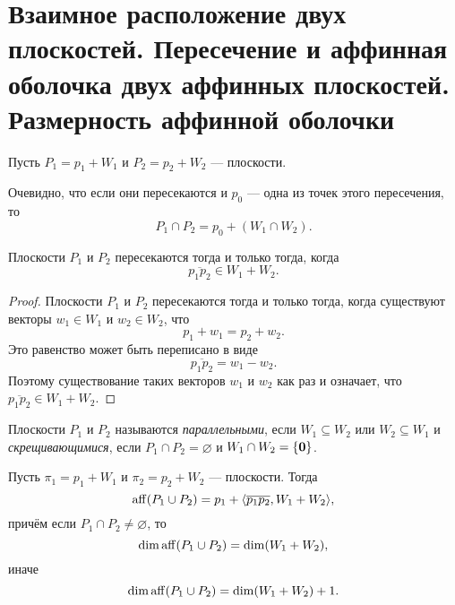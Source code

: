 \section{Взаимное расположение двух плоскостей. Пересечение и аффинная оболочка двух
аффинных плоскостей. Размерность аффинной оболочки}

Пусть $P_1 = p_1 + W_1$ и $P_2 = p_2 + W_2$ --- плоскости.

Очевидно, что если они пересекаются и $p_0$ --- одна из точек этого пересечения, то
\[
    P_1 \cap P_2 = p_0 + (W_1 \cap W_2).
\]

\begin{theorem}
    Плоскости $P_1$ и $P_2$ пересекаются тогда и только тогда, когда
    \[
        \overline{p_1p_2} \in W_1 + W_2.
    \]
\end{theorem}

\begin{proof}
    Плоскости $P_1$ и $P_2$ пересекаются тогда и только тогда, когда существуют векторы $w_1 \in W_1$ и $w_2 \in W_2$, что
    \[
        p_1 + w_1 = p_2 + w_2.
    \]
    Это равенство может быть переписано в виде
    \[
        \overline{p_1p_2} = w_1 - w_2.
    \]
    Поэтому существование таких векторов $w_1$ и $w_2$ как раз и означает, что $\overline{p_1p_2} \in W_1 + W_2$.
\end{proof}

\begin{definition}
    Плоскости $P_1$ и $P_2$ называются \textit{параллельными}, если $W_1 \subseteq W_2$ или $W_2 \subseteq W_1$ и \textit{скрещивающимися}, если $P_1 \cap P_2 = \varnothing$ и $W_1 \cap W_2 = \{\boldsymbol{0}\}$.
\end{definition}

\begin{theorem}
    Пусть $\pi_1 = p_1 + W_1$ и $\pi_2 = p_2 + W_2$ --- плоскости. Тогда
    \[
        \operatorname{aff}(P_1 \cup P_2) = p_1 + \langle\overline{p_1p_2}, W_1 + W_2\rangle,
    \]
    причём если $P_1 \cap P_2 \ne \varnothing$, то
    \[
        \dim\operatorname{aff}(P_1 \cup P_2) = \dim(W_1 + W_2),
    \]
    иначе
    \[
        \dim\operatorname{aff}(P_1 \cup P_2) = \dim(W_1 + W_2) + 1.
    \]
\end{theorem}

